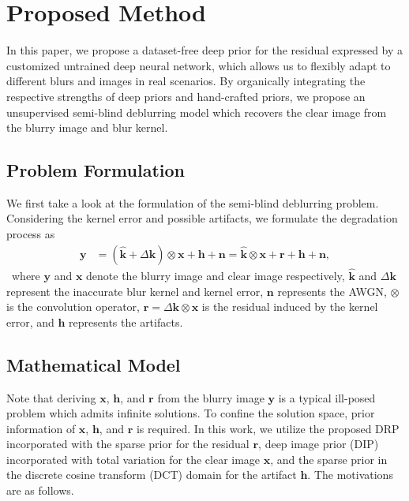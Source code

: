 \documentclass[10pt,twocolumn,letterpaper]{article}
\begin{document}
	\section{Proposed Method}
	In this paper, we propose a dataset-free deep prior for the residual expressed by a customized untrained deep neural network, which allows us to flexibly adapt to different blurs and images in real scenarios. By organically integrating the respective strengths of deep priors and hand-crafted priors, we propose an unsupervised semi-blind deblurring model which recovers the clear image from the blurry image and blur kernel.
	\subsection{Problem Formulation}
	We first take a look at the formulation of the semi-blind deblurring problem.
	Considering the kernel error and possible artifacts, we formulate the degradation process as
	\begin{align}\label{2}
		\boldsymbol{y}&=(\boldsymbol{\widehat k} + \Delta \boldsymbol{k})\otimes \boldsymbol{x}+\bm h+\boldsymbol{n}=\boldsymbol{\widehat k}\otimes \boldsymbol{x}+ \bm r+\bm h+\boldsymbol{n},
	\end{align}\
	where $\boldsymbol{y}$ and $\boldsymbol{x}$ denote the blurry image and clear image respectively, $\boldsymbol{\widehat k}$ and $\Delta \boldsymbol{k}$ represent the inaccurate blur kernel and kernel error, $\boldsymbol{n}$ represents the AWGN, $\otimes$ is the convolution operator, $\boldsymbol{r}=\Delta \boldsymbol{k} \otimes \boldsymbol{x}$ is the residual induced by the kernel error, and $\bm h$ represents the artifacts.
	
	
	\subsection{Mathematical Model}
	Note that deriving $\boldsymbol{x}$, {$\boldsymbol{h}$}, and $\boldsymbol{r}$ from the blurry image $\boldsymbol{y}$ is {a typical ill-posed problem} which admits {infinite} solutions. To confine the solution space, prior information of $\boldsymbol{x}$, $\boldsymbol{h}$, and $\boldsymbol{r}$ is required. In this work, we utilize the proposed DRP incorporated with the sparse prior for the residual $\bm r$, deep image prior (DIP) \cite{imaulyanov2018deep} incorporated with total variation for the clear image $\bm x$, and the sparse prior in the discrete cosine transform (DCT) domain for the artifact $\bm h$. The motivations are as follows.
	
\end{document}
